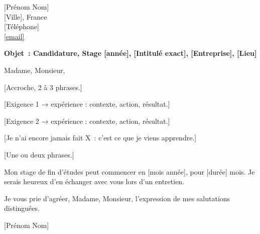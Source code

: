 \documentclass[11pt,a4paper]{article}
\begin{document}
\pagestyle{empty}

[Prénom Nom]\\[4pt]
[Ville], France\\[4pt]
[Téléphone]\\[4pt]
\href{mailto:[email]}{\underline{[email]}}

\vspace{20pt}

{\raggedright \textbf{Objet~: Candidature, Stage [année], [Intitulé exact], [Entreprise], [Lieu]}\par}

Madame, Monsieur,

[Accroche, 2 à 3 phrases.]

[Exigence 1 → expérience : contexte, action, résultat.]

[Exigence 2 → expérience : contexte, action, résultat.]

[Je n'ai encore jamais fait X~: c'est ce que je viens apprendre.]

[Une ou deux phrases.]

Mon stage de fin d'études peut commencer en [mois année], pour [durée] mois. Je serais heureux d'en échanger avec vous lors d'un entretien.

Je vous prie d'agréer, Madame, Monsieur, l'expression de mes salutations distinguées.

[Prénom Nom]
\end{document}
